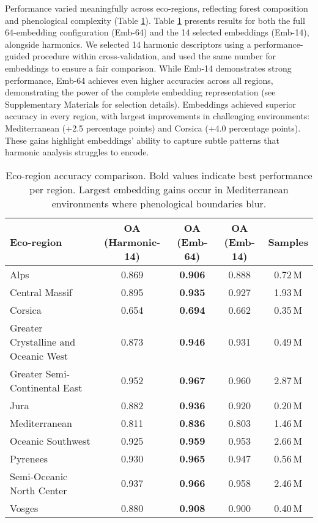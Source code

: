 \documentclass[utf8]{FrontiersinHarvard}
\begin{document}
Performance varied meaningfully across eco-regions, reflecting forest composition and phenological complexity (Table \ref{tab:eco_region_comparison}). Table \ref{tab:eco_region_comparison} presents results for both the full 64-embedding configuration (Emb-64) and the 14 selected embeddings (Emb-14), alongside harmonics. We selected 14 harmonic descriptors using a performance-guided procedure within cross-validation, and used the same number for embeddings to ensure a fair comparison. While Emb-14 demonstrates strong performance, Emb-64 achieves even higher accuracies across all regions, demonstrating the power of the complete embedding representation (see Supplementary Materials for selection details). Embeddings achieved superior accuracy in every region, with largest improvements in challenging environments: Mediterranean (+2.5 percentage points) and Corsica (+4.0 percentage points). These gains highlight embeddings' ability to capture subtle patterns that harmonic analysis struggles to encode.
\begin{table}[H]
\centering
\begin{tabular}{lcccc}
\hline
\textbf{Eco-region} & \textbf{OA (Harmonic-14)} & \textbf{OA (Emb-64)} & \textbf{OA (Emb-14)} & \textbf{Samples} \\ \hline
Alps & 0.869 & \textbf{0.906} & 0.888 & 0.72\,M \\
Central Massif & 0.895 & \textbf{0.935} & 0.927 & 1.93\,M \\
Corsica & 0.654 & \textbf{0.694} & 0.662 & 0.35\,M \\
Greater Crystalline and Oceanic West & 0.873 & \textbf{0.946} & 0.931 & 0.49\,M \\
Greater Semi-Continental East & 0.952 & \textbf{0.967} & 0.960 & 2.87\,M \\
Jura & 0.882 & \textbf{0.936} & 0.920 & 0.20\,M \\
Mediterranean & 0.811 & \textbf{0.836} & 0.803 & 1.46\,M \\
Oceanic Southwest & 0.925 & \textbf{0.959} & 0.953 & 2.66\,M \\
Pyrenees & 0.930 & \textbf{0.965} & 0.947 & 0.56\,M \\
Semi-Oceanic North Center & 0.937 & \textbf{0.966} & 0.958 & 2.46\,M \\
Vosges & 0.880 & \textbf{0.908} & 0.900 & 0.40\,M \\ \hline
\end{tabular}
\caption{Eco-region accuracy comparison. Bold values indicate best performance per region. Largest embedding gains occur in Mediterranean environments where phenological boundaries blur.}
\label{tab:eco_region_comparison}
\end{table}
\end{document}
